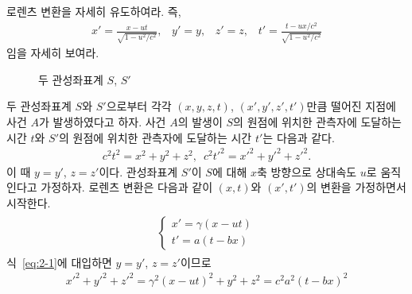 \documentclass[tightenlines,floatfix,nofootinbib,superscriptaddress,fleqn]{revtex4}
\begin{document}
\vspace{1cm}

로렌츠 변환을 자세히 유도하여라. 즉,
\begin{align}
  \label{eq:1}
  x' = \frac{x-ut}{\sqrt{1-u^2/c^2}},\;\;\; y'=y,\;\;\;z'=z,\;\;\;
  t' = \frac{t-ux/c^2}{\sqrt{1-u^2/c^2}}
\end{align}
임을 자세히 보여라. 

\begin{figure}[htp]
  \centering
  \caption{두 관성좌표계 $S$, $S'$}
  \label{fig:2-1}
\end{figure}
두 관성좌표계 $S$와 $S'$으로부터 각각 $(x,y,z,t)$, $(x',y',z',t')$만큼 떨어진 지점에
사건 $A$가 발생하였다고 하자. 사건 $A$의 발생이 $S$의 원점에 위치한 관측자에 도달하는 시간
$t$와 $S'$의 원점에 위치한 관측자에 도달하는 시간 $t'$는 다음과 같다.
\begin{align}\label{eq:2-1}
  c^2t^2 = x^2+y^2+z^2,\,\,\,  c^2t'^2 = x'^2+y'^2+z'^2.
\end{align}
이 때 $y=y'$, $z=z'$이다. 관성좌표계 $S'$이 $S$에 대해 $x$축 방향으로
상대속도 $u$로 움직인다고 가정하자. 로렌츠 변환은 다음과 같이 $(x,t)$와 $(x',t')$의
변환을 가정하면서 시작한다.
\begin{align}\label{eq:2-2}
  \begin{split}
    \begin{cases}
      x'=\gamma(x-ut) \\
      t'=a(t-bx)
    \end{cases}
  \end{split}
\end{align}
식~\eqref{eq:2-1}에 대입하면 $y=y'$, $z=z'$이므로
\begin{align}
  x'^2+y'^2+z'^2 = \gamma^2(x-ut)^2+y^2+z^2 = c^2a^2(t-bx)^2
\end{align}
\end{document}
